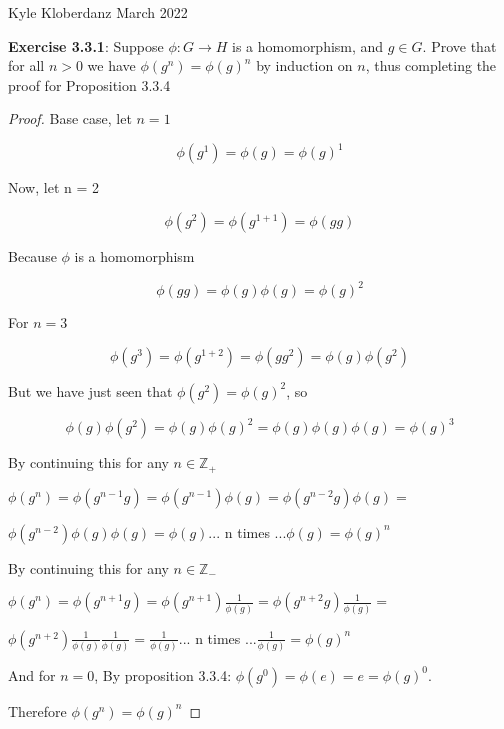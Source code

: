 \documentclass[a4paper]{article}
\begin{document}
\begin{myparindent}{0pt}

Kyle Kloberdanz  March 2022 \newline

\textbf{Exercise 3.3.1}:
Suppose $\phi: G \rightarrow H$ is a homomorphism, and $g \in G$. Prove that
for all $n > 0$ we have $\phi(g^n) = \phi(g)^n$ by induction on $n$, thus
completing the proof for Proposition 3.3.4
\newline

\begin{proof}

Base case, let $n = 1$

\[ \phi(g^1) = \phi(g) = \phi(g)^1 \]

Now, let n = 2

\[ \phi(g^2) = \phi(g^{1 + 1}) = \phi(gg) \]

Because $\phi$ is a homomorphism

\[ \phi(gg) = \phi(g) \phi(g) = \phi(g)^2 \]

For $n = 3$

\[ \phi(g^3) = \phi(g^{1 + 2}) = \phi(gg^2) = \phi(g) \phi(g^2) \]

But we have just seen that $\phi(g^2) = \phi(g)^2$, so

\[ \phi(g) \phi(g^2) = \phi(g) \phi(g)^2 = \phi(g) \phi(g) \phi(g) = \phi(g)^3 \]

By continuing this for any $n \in \mathbb{Z_{+}}$

$\phi(g^n) = \phi(g^{n - 1}g) = \phi(g^{n - 1}) \phi(g) = \phi(g^{n - 2}g) \phi(g) =$

$\phi(g^{n-2}) \phi(g) \phi(g) = \phi(g) ...$ n times $... \phi(g) = \phi(g)^n$
\newline

By continuing this for any $n \in \mathbb{Z_{-}}$

$\phi(g^n) = \phi(g^{n + 1}g) = \phi(g^{n + 1}) \frac{1}{\phi(g)} = \phi(g^{n + 2}g) \frac{1}{\phi(g)} =$

$\phi(g^{n+2}) \frac{1}{\phi(g)} \frac{1}{\phi(g)} = \frac{1}{\phi(g)} ...$ n times $... \frac{1}{\phi(g)} = \phi(g)^n$
\newline

And for $n = 0$, By proposition 3.3.4: $\phi(g^0) = \phi(e) = e = \phi(g)^0$.
\newline

Therefore $\phi(g^n) = \phi(g)^n$
\end{proof}


\end{myparindent}
\end{document}
